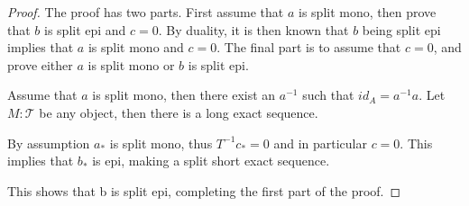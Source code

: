     \begin{proof}
        The proof has two parts. First assume that $a$ is split mono, then prove that $b$ is split epi and $c = 0$. By duality, it is then known that $b$ being split epi implies that $a$ is split mono and $c = 0$. The final part is to assume that $c = 0$, and prove either $a$ is split mono or $b$ is split epi.

        Assume that $a$ is split mono, then there exist an $a^{-1}$ such that $id_A = a^{-1}a$. Let $M:\mathcal{T}$ be any object, then there is a long exact sequence.
        \begin{center}
        \end{center}
        By assumption $a_*$ is split mono, thus $T^{-1}c_* = 0$ and in particular $c = 0$. This implies that $b_*$ is epi, making a split short exact sequence.
        \begin{center}
        \end{center}
        This shows that b is split epi, completing the first part of the proof.


\end{proof}
